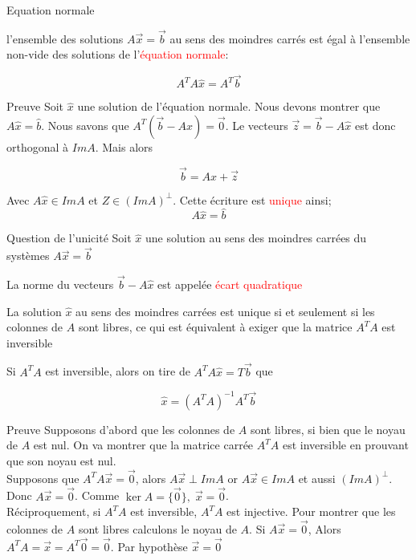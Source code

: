 \begin{parag}{Equation normale}
\begin{theoreme}
l'ensemble des solutions $A\vec{x} = \vec{b}$ au sens des moindres carrés est égal à l'ensemble non-vide des solutions de l'\textcolor{red}{équation normale}:
\begin{formule}
    \[A^TA\hat{x} = A^T\vec{b}\]
\end{formule}
\end{theoreme}
\begin{subparag}{Preuve}
    Soit $\hat{x}$ une solution de l'équation normale. Nous devons montrer que $A\hat{x} = \hat{b}$. Nous savons que $A^T(\vec{b} - A\hat{x}) = \vec{0}$. Le vecteurs $\vec{z} = \vec{b} - A\hat{x}$ est donc orthogonal à $ImA$. Mais alors 
    \begin{formule}
        \[\vec{b}  = A\hat{x} + \vec{z}\]
    \end{formule}
    Avec $A\hat{x}\in ImA$ et $Z \in (ImA)^\perp$. Cette écriture est \textcolor{red}{unique} ainsi;
    \[A\hat{x} = \hat{b}\]
\end{subparag}
\end{parag}
\begin{parag}{Question de l'unicité}
    Soit $\hat{x}$ une solution au sens des moindres carrées du systèmes $A\vec{x} = \vec{b}$
    \begin{definition}
        La norme du vecteurs $\vec{b}-A\hat{x}$ est appelée \textcolor{red}{écart quadratique}
    \end{definition}
    \begin{theoreme}
        La solution $\hat{x}$ au sens des moindres carrées est unique si et seulement si les colonnes de $A$ sont libres, ce qui est équivalent à exiger que la matrice $A^TA$ est inversible
    \end{theoreme}
    Si $A^TA$ est inversible, alors on tire de $
    A^TA\hat{x} = T\vec{b}$ que 
    \begin{formule}
        \[\hat{x} = (A^TA)^{-1}A^T\vec{b}\]
    \end{formule}
    \begin{subparag}{Preuve}
        Supposons d'abord que les colonnes de $A$ sont libres, si bien que le noyau de $A$ est nul. On va montrer que la matrice carrée $A^TA$ est inversible en prouvant que son noyau est nul.
        \\
        Supposons que $A^TA\vec{x} = \vec{0}$, alors $A\vec{x} \perp ImA$ or $A\vec{x} \in ImA$ et aussi $(ImA)^\perp$. Donc $A\vec{x} = \vec{0}$. Comme $\ker A = \{\vec{0}\}, \; \vec{x} = \vec{0}$.
        \\
        Réciproquement, si $A^TA$ est inversible, $A^TA$ est injective. Pour montrer que les colonnes de $A$ sont libres calculons le noyau de $A$. Si $A\vec{x} = \vec{0}$, Alors $A^TA = \vec{x} = A^T\vec{0} = \vec{0}$. Par hypothèse $\vec{x} = \vec{0}$
    \end{subparag}
\end{parag}
